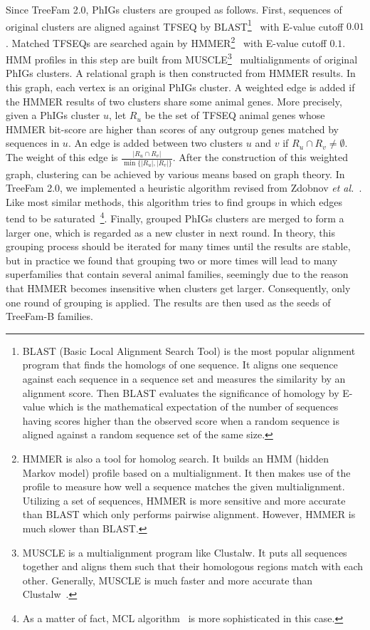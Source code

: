 Since TreeFam 2.0, PhIGs clusters are grouped as follows. First, sequences of original clusters
are aligned against TFSEQ by BLAST\footnote{BLAST (Basic Local Alignment Search Tool)
is the most popular alignment program that finds the homologs of one sequence.
It aligns one sequence against each sequence in a sequence set and measures the similarity
by an alignment score. Then BLAST evaluates the significance 
of homology by E-value which is the mathematical expectation of the number of sequences having scores higher than the observed score
when a random sequence is aligned against a random sequence set of the same size.}~\cite{altschul97}
with E-value cutoff $0.01$.
Matched TFSEQs are searched again by HMMER\footnote{HMMER is also a tool for homolog search. It builds an HMM (hidden Markov model)
profile based on a multialignment. It then makes use of the profile to measure how well
a sequence matches the given multialignment. Utilizing a set of sequences, HMMER
is more sensitive and more accurate than BLAST which only performs pairwise alignment.
However, HMMER is much slower than BLAST.}~\cite{eddy98} with E-value cutoff $0.1$.
HMM profiles in this step are built from MUSCLE\footnote{MUSCLE is a multialignment
program like Clustalw. It puts all sequences together and aligns them such that their
homologous regions match with each other. Generally, MUSCLE is much faster and more accurate than
Clustalw~\cite{edgar04}.}~\cite{edgar04} multialignments of original
PhIGs clusters. A relational graph is then constructed from HMMER results. In this graph,
each vertex is an original PhIGs cluster. A weighted edge is added if the HMMER
results of two clusters share some animal genes. More precisely,
given a PhIGs cluster $u$, let $R_u$ be the set of TFSEQ animal genes whose HMMER bit-score
are higher than scores of any outgroup genes matched by sequences in $u$. An edge is added between
two clusters $u$ and $v$ if $R_u\cap R_v\not=\emptyset$. The weight of this
edge is $\frac{|R_u\cap R_v|}{\min\{|R_u|,|R_v|\}}$. After the construction
of this weighted graph, clustering can be achieved by various means
based on graph theory. In TreeFam 2.0, we implemented a heuristic algorithm
revised from Zdobnov {\it et al.}~\cite{zdobnov02}. Like most similar methods, this algorithm tries to find groups
in which edges tend to be saturated~\footnote{As a matter of fact, MCL algorithm~\cite{enright02}
is more sophisticated in this case.}. Finally, grouped PhIGs clusters are
merged to form a larger one, which is regarded as a new cluster in next round.
In theory, this grouping process should be iterated for many times until the results
are stable, but in practice we found that grouping two or more times will
lead to many superfamilies that contain several animal families, seemingly due to the reason that HMMER becomes
insensitive when clusters get larger. Consequently, only one round of
grouping is applied. The results are then used as the seeds of TreeFam-B families.

